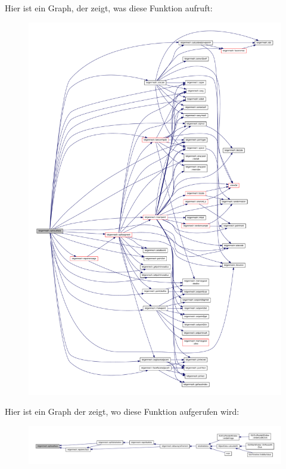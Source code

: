 Hier ist ein Graph, der zeigt, was diese Funktion aufruft\-:
\nopagebreak
\begin{figure}[H]
\begin{center}
\leavevmode
\includegraphics[width=350pt]{classtetgenmesh_a3a8404870ab3c2e8ce4312d48c2b29f4_cgraph}
\end{center}
\end{figure}




Hier ist ein Graph der zeigt, wo diese Funktion aufgerufen wird\-:
\nopagebreak
\begin{figure}[H]
\begin{center}
\leavevmode
\includegraphics[width=350pt]{classtetgenmesh_a3a8404870ab3c2e8ce4312d48c2b29f4_icgraph}
\end{center}
\end{figure}


